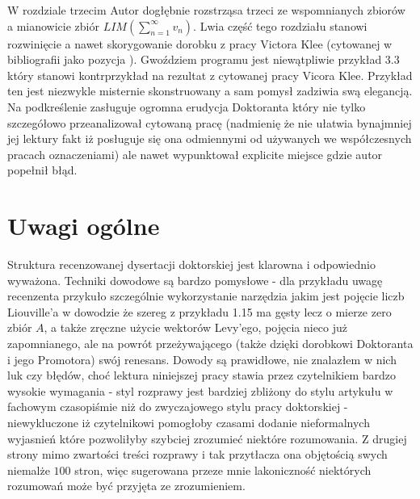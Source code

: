 \documentclass[12pt]{article}
\begin{document}
  W rozdziale trzecim Autor dogłębnie rozstrząsa 
trzeci ze wspomnianych zbiorów a mianowicie
zbiór $LIM(\sum_{n=1}^\infty v_n)$. Lwia część 
tego rozdziału stanowi rozwinięcie a nawet
skorygowanie dorobku z pracy Victora Klee
(cytowanej w bibliografii jako pozycja \big[28\big]).
Gwoździem programu jest niewątpliwie przykład
3.3 który stanowi kontrprzykład na rezultat
z cytowanej pracy Vicora Klee. Przykład ten
jest niezwykle misternie skonstruowany a
sam pomysł zadziwia swą elegancją. Na podkreślenie zasługuje 
ogromna erudycja Doktoranta który nie tylko
szczegółowo przeanalizował cytowaną
pracę (nadmienię że nie ułatwia bynajmniej jej lektury fakt
iż posługuje się ona odmiennymi od 
używanych we współczesnych pracach oznaczeniami)
ale nawet wypunktował explicite miejsce gdzie autor 
popełnił błąd.

\section{Uwagi ogólne}

  Struktura recenzowanej dysertacji doktorskiej jest
klarowna i odpowiednio wyważona. Techniki dowodowe 
są bardzo pomysłowe - dla przykładu uwagę recenzenta 
przykuło szczególnie wykorzystanie narzędzia jakim jest
pojęcie liczb Liouville'a w dowodzie że szereg z przykładu
1.15 ma gęsty lecz o mierze zero zbiór $A$, a także
zręczne użycie wektorów Levy'ego, pojęcia nieco już 
zapomnianego, ale na powrót 
przeżywającego (także dzięki dorobkowi Doktoranta i jego Promotora) 
swój renesans. 
  Dowody są prawidłowe, nie znalazłem w nich luk czy 
błędów, choć lektura niniejszej pracy stawia przez
czytelnikiem bardzo wysokie wymagania - styl rozprawy
jest bardziej zbliżony do stylu artykułu w fachowym czasopiśmie
niż do zwyczajowego stylu pracy doktorskiej - niewykluczone
iż czytelnikowi pomogłoby czasami dodanie nieformalnych
wyjasnień które pozwoliłyby szybciej zrozumieć niektóre 
rozumowania. Z drugiej strony mimo zwartości treści 
rozprawy i tak przytłacza ona objętością swych niemalże
$100$ stron, więc sugerowana przeze mnie lakoniczność
niektórych rozumowań może być przyjęta ze zrozumieniem.

\end{document}
